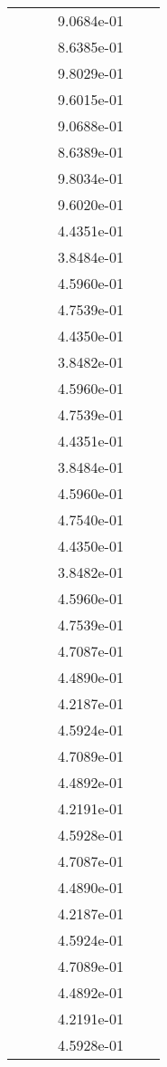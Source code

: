 \begin{xltabular}{\textwidth}{r|rS[table-format=1.3e+2]S[table-format=1.4e+2]S[table-format=1.4e+2]S[table-format=-1.5]}
&  &  & 9.0684e-01 & & \\
&  &  & 8.6385e-01 & & \\
&  &  & 9.8029e-01 & & \\
&  &  & 9.6015e-01 & & \\
&  &  & 9.0688e-01 & & \\
&  &  & 8.6389e-01 & & \\
&  &  & 9.8034e-01 & & \\
&  &  & 9.6020e-01 & & \\
&  &  & 4.4351e-01 & & \\
&  &  & 3.8484e-01 & & \\
&  &  & 4.5960e-01 & & \\
&  &  & 4.7539e-01 & & \\
&  &  & 4.4350e-01 & & \\
&  &  & 3.8482e-01 & & \\
&  &  & 4.5960e-01 & & \\
&  &  & 4.7539e-01 & & \\
&  &  & 4.4351e-01 & & \\
&  &  & 3.8484e-01 & & \\
&  &  & 4.5960e-01 & & \\
&  &  & 4.7540e-01 & & \\
&  &  & 4.4350e-01 & & \\
&  &  & 3.8482e-01 & & \\
&  &  & 4.5960e-01 & & \\
&  &  & 4.7539e-01 & & \\
&  &  & 4.7087e-01 & & \\
&  &  & 4.4890e-01 & & \\
&  &  & 4.2187e-01 & & \\
&  &  & 4.5924e-01 & & \\
&  &  & 4.7089e-01 & & \\
&  &  & 4.4892e-01 & & \\
&  &  & 4.2191e-01 & & \\
&  &  & 4.5928e-01 & & \\
&  &  & 4.7087e-01 & & \\
&  &  & 4.4890e-01 & & \\
&  &  & 4.2187e-01 & & \\
&  &  & 4.5924e-01 & & \\
&  &  & 4.7089e-01 & & \\
&  &  & 4.4892e-01 & & \\
&  &  & 4.2191e-01 & & \\
&  &  & 4.5928e-01 & & \\

\end{xltabular}
